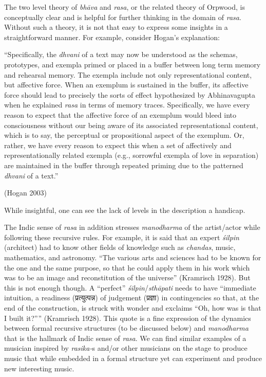 The two level theory of \textsl{bhāva} and \textsl{rasa}, or the related theory of Orpwood, is conceptually clear and is helpful for further thinking in the domain of \textsl{rasa}. Without such a theory, it is not that easy to express some insights in a straightforward manner. For example, consider Hogan’s explanation: 

\begin{myquote}
“Specifically, the \textsl{dhvani} of a text may now be understood as the schemas, prototypes, and exempla primed or placed in a buffer between long term memory and rehearsal memory. The exempla include not only representational content, but affective force. When an exemplum is sustained in the buffer, its affective force should lead to precisely the sorts of effect hypothesized by Abhinavagupta when he explained \textsl{rasa} in terms of memory traces. Specifically, we have every reason to expect that the affective force of an exemplum would bleed into consciousness without our being aware of its associated representational content, which is to say, the perceptual or propositional aspect of the exemplum. Or, rather, we have every reason to expect this when a set of affectively and representationally related exempla (e.g., sorrowful exempla of love in separation) are maintained in the buffer through repeated priming due to the patterned \textsl{dhvani} of a text.” 

\hfill(Hogan 2003)
\end{myquote}

While insightful, one can see the lack of levels in the description a handicap.

The Indic sense of \textsl{rasa} in addition stresses \textsl{manodharma} of the artist/actor while following these recursive rules. For example, it is said that an expert \textsl{śilpin} (architect) had to know other fields of knowledge such as \textsl{chandas}, music, mathematics, and astronomy. “The various arts and sciences had to be known for the one and the same purpose, so that he could apply them in his work which was to be an image and reconstitution of the universe” (Kramrisch 1928). But this is not enough though. A “perfect” \textsl{śilpin}/\textsl{sthāpati} needs to have “immediate intuition, a readiness ({\dev प्रत्युत्पन्न}) of judgement ({\dev प्रज्ञा}) in contingencies so that, at the end of the construction, is struck with wonder and exclaims “Oh, how was is that I built it?”” (Kramrisch 1928). This quote is a fine expression of the dynamics between formal recursive structures (to be discussed below) and \textsl{manodharma} that is the hallmark of Indic sense of \textsl{rasa}. We can find similar examples of a musician inspired by \textsl{rasika-}s and/or other musicians on the stage to produce music that while embedded in a formal structure yet can experiment and produce new interesting music.

